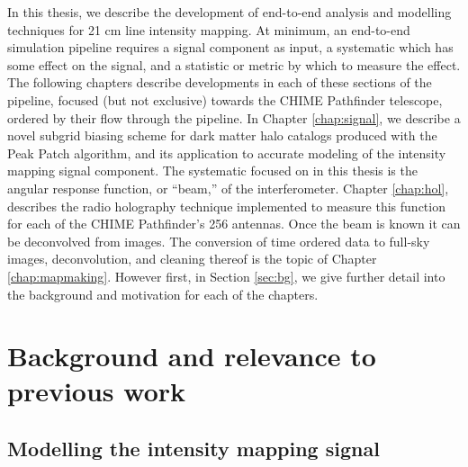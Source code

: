 In this thesis, we describe the development of end-to-end analysis and modelling techniques for 21 cm line intensity mapping. At minimum, an end-to-end simulation pipeline requires a signal component as input, a systematic which has some effect on the signal, and a statistic or metric by which to measure the effect. The following chapters describe developments in each of these sections of the pipeline, focused (but not exclusive) towards the CHIME Pathfinder telescope, ordered by their flow through the pipeline. In Chapter \ref{chap:signal}, we describe a novel subgrid biasing scheme for dark matter halo catalogs produced with the Peak Patch algorithm, and its application to accurate modeling of the intensity mapping signal component. The systematic focused on in this thesis is the angular response function, or ``beam,'' of the interferometer. Chapter \ref{chap:hol}, describes the radio holography technique implemented to measure this function for each of the CHIME Pathfinder's 256 antennas. Once the beam is known it can be deconvolved from images. The conversion of time ordered data to full-sky images, deconvolution, and cleaning thereof is the topic of Chapter \ref{chap:mapmaking}. However first, in Section \ref{sec:bg}, we give further detail into the background and motivation for each of the chapters.

\section{\label{sec:bg} Background and relevance to previous work}

\subsection{\label{sec:bg:subsec:signal} Modelling the intensity mapping signal}


